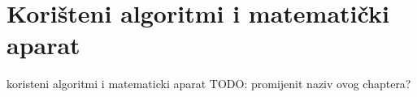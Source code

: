 \chapter{Korišteni algoritmi i matematički aparat}

koristeni algoritmi i matematicki aparat
TODO: promijenit naziv ovog chaptera?